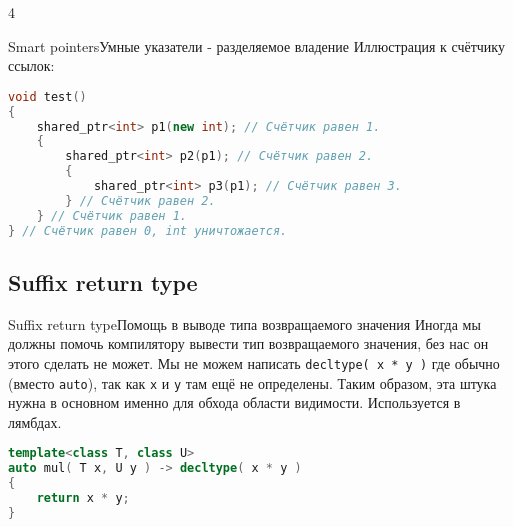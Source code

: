 4\documentclass[10pt]{beamer}
\begin{document}
\begin{frame}[fragile]{Smart pointers}{Умные указатели - разделяемое владение}
Иллюстрация к счётчику ссылок:
\begin{lstlisting}[language=C++]
void test()
{
    shared_ptr<int> p1(new int); // Счётчик равен 1.
    {
        shared_ptr<int> p2(p1); // Счётчик равен 2.
        {
            shared_ptr<int> p3(p1); // Счётчик равен 3.
        } // Счётчик равен 2.
    } // Счётчик равен 1.
} // Счётчик равен 0, int уничтожается.

\end{lstlisting}
\end{frame}

\subsection{Suffix return type}
\hypertarget{Suffix return type}{}
\begin{frame}[fragile]{Suffix return type}{Помощь в выводе типа возвращаемого значения}
Иногда мы должны помочь компилятору вывести тип возвращаемого значения, без нас он этого сделать не может. Мы не можем написать \texttt{decltype( x * y )} где обычно (вместо \texttt{auto}), так как \texttt{x} и \texttt{y} там ещё не определены. Таким образом, эта штука нужна в основном именно для обхода области видимости. Используется в лямбдах.
\begin{lstlisting}[language=C++]
template<class T, class U>
auto mul( T x, U y ) -> decltype( x * y )
{
    return x * y;
}
\end{lstlisting}
\end{frame}
\end{document}

